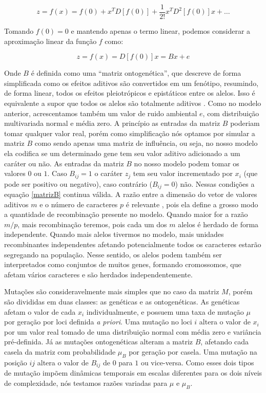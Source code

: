\begin{equation}
z = f(x) = f(0) + x^T D[f(0)] + \frac{1}{2!} x^T D^2 [f(0)] x + \ldots
\end{equation}

Tomando $f(0) = 0$ e mantendo apenas o termo linear, podemos considerar
a aproximação linear da função $f$ como:

\begin{equation}
z = f(x) = D[f(0)]x = Bx + e
\label{matrizB}
\end{equation}

Onde $B$ é definida como uma ``matriz ontogenética'', que descreve de
forma simplificada como os efeitos aditivos são convertidos em um
fenótipo, resumindo, de forma linear, todos os efeitos pleiotrópicos e
epistáticos entre os alelos.
Isso é equivalente a supor que todos os alelos são totalmente aditivos
\citep{Wagner1989}.
Como no modelo anterior, acrescentamos também um valor de ruido
ambiental $e$, com distribuição multivariada normal e média zero.
A princípio as entradas da matriz $B$ poderiam tomar qualquer valor
real, porém como simplificação nós optamos por simular a matriz $B$ como
sendo apenas uma matriz de influência, ou seja, no nosso modelo ela
codifica se um determinado gene tem seu valor aditivo adicionado a um
caráter ou não.
As entradas da matriz $B$ no nosso modelo podem tomar os valores $0$ ou
$1$.
Caso $B_{ij} = 1$ o caráter $z_j$ tem seu valor incrementado por $x_i$
(que pode ser positivo ou negativo), caso contrário ($B_{ij} = 0$) não.
Nessas condições a equação \ref{matrizB} continua válida.
A razão entre a dimensão do vetor de valores aditivos $m$ e o número de
caracteres $p$ é relevante \citep{Wagner1984}, pois ela define a grosso modo
a quantidade de recombinação presente no modelo.
Quando maior for a razão $m/p$, mais recombinação teremos, pois cada
um dos $m$ alelos é herdado de forma independente.
Quando mais alelos tivermos no modelo, mais unidades recombinantes
independentes afetando potencialmente todos os caracteres estarão segregando
na população.
Nesse sentido, os alelos podem também ser interpretados como conjuntos de
muitos genes, formando cromossomos, que afetam vários caracteres e são
herdados independentemente.

Mutações são consideravelmente mais simples que no caso da
matriz $M$, porém são divididas em duas classes: as genéticas e as
ontogenéticas.
As genéticas afetam o valor de cada $x_i$ individualmente, e possuem uma
taxa de mutação $\mu$ por geração por loci definida {\it a priori}.
Uma mutação no loci $i$ altera o valor de $x_i$ por um valor real tomado
de uma distribuição normal com média zero e variância pré-definida.
Já as mutações ontogenéticas alteram a matriz $B$, afetando cada casela
da matriz com probabilidade $\mu_B$ por geração por casela.
Uma mutação na posição $ij$ altera o valor de $B_{ij}$ de $0$ para $1$
ou vice-versa.
Como esses dois tipos de mutação impõem dinâmicas temporais em escalas
diferentes para os dois níveis de complexidade, nós testamos razões
variadas para $\mu$ e $\mu_B$.

